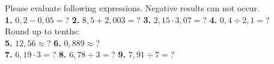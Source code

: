 \documentclass[a4paper]{article}
\begin{document}
\begin{Large}

Please evaluate following expressions. Negative results can not occur. \\[0.75cm]

\textbf{1.} $0,2 - 0,05=$? \hspace{0.3cm}
\textbf{2.} $8,5 + 2,003=$? \hspace{0.3cm}
\textbf{3.} $2,15 \cdot 3,07=$? \hspace{0.3cm}
\textbf{4.} $0,4 \div 2,1=$? \\[0.75cm]

Round up to tenths: \\[0.75cm]
		
\textbf{5.} $12,56 \approx$? \hspace{0.3cm}
\textbf{6.} $0,889 \approx$? \\[0.75cm]
\textbf{7.} $6,19 \cdot 3=$? \hspace{0.3cm}
\textbf{8.} $6,78 \div 3=$? \hspace{0.3cm}
\textbf{9.} $7,91 \div 7=$? \\[0.75cm]


\end{Large}
\end{document}
